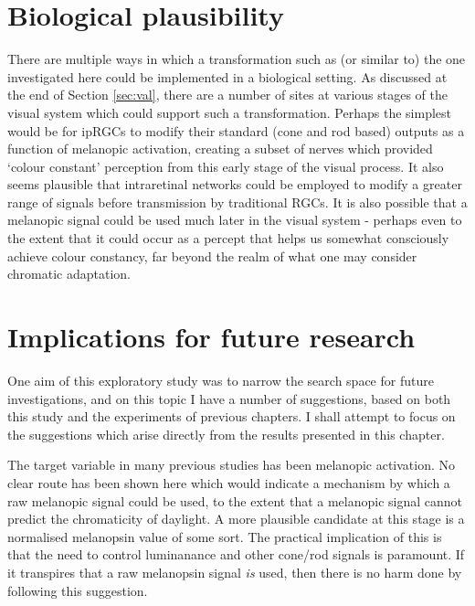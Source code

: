 
\section{Biological plausibility}

There are multiple ways in which a transformation such as (or similar to) the one investigated here could be implemented in a biological setting. As discussed at the end of Section \ref{sec:val}, there are a number of sites at various stages of the visual system which could support such a transformation. Perhaps the simplest would be for \glspl{ipRGC} to modify their standard (cone and rod based) outputs as a function of melanopic activation, creating a subset of nerves which provided `colour constant' perception from this early stage of the visual process. It also seems plausible that intraretinal networks could be employed to modify a greater range of signals before transmission by traditional \glspl{RGC}. It is also possible that a melanopic signal could be used much later in the visual system - perhaps even to the extent that it could occur as a percept \citep{spitschan_human_2017} that helps us somewhat consciously achieve colour constancy, far beyond the realm of what one may consider chromatic adaptation.

\section{Implications for future research}

One aim of this exploratory study was to narrow the search space for future investigations, and on this topic I have a number of suggestions, based on both this study and the experiments of previous chapters. I shall attempt to focus on the suggestions which arise directly from the results presented in this chapter.

The target variable in many previous studies has been melanopic activation. No clear route has been shown here which would indicate a mechanism by which a raw melanopic signal could be used, to the extent that a melanopic signal cannot predict the chromaticity of daylight. A more plausible candidate at this stage is a normalised melanopsin value of some sort. The practical implication of this is that the need to control luminanance and other cone/rod signals is paramount. If it transpires that a raw melanopsin signal \emph{is} used, then there is no harm done by following this suggestion.

